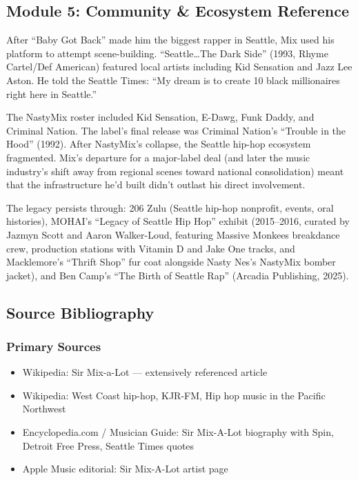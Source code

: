 \documentclass[11pt,letterpaper]{article}
\begin{document}
\subsection{Module 5: Community \& Ecosystem Reference}

After ``Baby Got Back'' made him the biggest rapper in Seattle, Mix used his platform to attempt scene-building. ``Seattle\ldots The Dark Side'' (1993, Rhyme Cartel/Def American) featured local artists including Kid Sensation and Jazz Lee Aston. He told the Seattle Times: ``My dream is to create 10 black millionaires right here in Seattle.''

The NastyMix roster included Kid Sensation, E-Dawg, Funk Daddy, and Criminal Nation. The label's final release was Criminal Nation's ``Trouble in the Hood'' (1992). After NastyMix's collapse, the Seattle hip-hop ecosystem fragmented. Mix's departure for a major-label deal (and later the music industry's shift away from regional scenes toward national consolidation) meant that the infrastructure he'd built didn't outlast his direct involvement.

The legacy persists through: 206 Zulu (Seattle hip-hop nonprofit, events, oral histories), MOHAI's ``Legacy of Seattle Hip Hop'' exhibit (2015--2016, curated by Jazmyn Scott and Aaron Walker-Loud, featuring Massive Monkees breakdance crew, production stations with Vitamin D and Jake One tracks, and Macklemore's ``Thrift Shop'' fur coat alongside Nasty Nes's NastyMix bomber jacket), and Ben Camp's ``The Birth of Seattle Rap'' (Arcadia Publishing, 2025).

\subsection{Source Bibliography}

\subsubsection{Primary Sources}
\begin{itemize}[leftmargin=2em]
\item Wikipedia: Sir Mix-a-Lot --- extensively referenced article
\item Wikipedia: West Coast hip-hop, KJR-FM, Hip hop music in the Pacific Northwest
\item Encyclopedia.com / Musician Guide: Sir Mix-A-Lot biography with Spin, Detroit Free Press, Seattle Times quotes
\item Apple Music editorial: Sir Mix-A-Lot artist page
\end{itemize}
\end{document}
